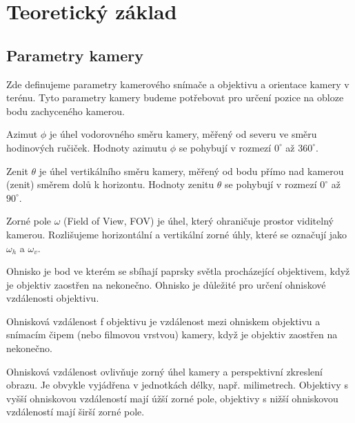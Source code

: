 


\chapter{Teoretický základ}
\section{Parametry kamery}

Zde definujeme parametry kamerového snímače a objektivu a orientace kamery v terénu. Tyto parametry kamery budeme potřebovat pro určení pozice na obloze bodu zachyceného kamerou.

\begin{definice}[Azimut]\label{def01:1}
  Azimut $\phi$ je úhel vodorovného směru kamery, měřený od severu ve směru hodinových ručiček. Hodnoty azimutu $\phi$ se pohybují v rozmezí $0^\circ$ až $360^\circ$.
\end{definice}

\begin{definice}[Zenit]\label{def01:2}
  Zenit $\theta$ je úhel vertikálního směru kamery, měřený od bodu přímo nad kamerou (zenit) směrem dolů k horizontu. Hodnoty zenitu $\theta$ se pohybují v rozmezí $0^\circ$ až $90^\circ$.
\end{definice}

\begin{definice}\label{def01:3}
  Zorné pole $\omega$ (Field of View, FOV) je úhel, který ohraničuje prostor viditelný kamerou. Rozlišujeme horizontální a vertikální zorné úhly, které se označují jako $\omega_h$ a $\omega_v$.
\end{definice}

\begin{definice}[Ohnisko]\label{def01:4}
  Ohnisko je bod ve kterém se sbíhají paprsky světla procházející objektivem, když je objektiv zaostřen na nekonečno. Ohnisko je důležité pro určení ohniskové vzdálenosti objektivu.
\end{definice}

\begin{definice}\label{def01:5}
  Ohnisková vzdálenost f objektivu je vzdálenost mezi ohniskem objektivu a snímacím čipem (nebo filmovou vrstvou) kamery, když je objektiv zaostřen na nekonečno.

  Ohnisková vzdálenost ovlivňuje zorný úhel kamery a perspektivní zkreslení obrazu. Je obvykle vyjádřena v jednotkách délky, např. milimetrech. Objektivy s vyšší ohniskovou vzdáleností mají úžší zorné pole, objektivy s nižší ohniskovou vzdáleností mají širší zorné pole.
\end{definice}

